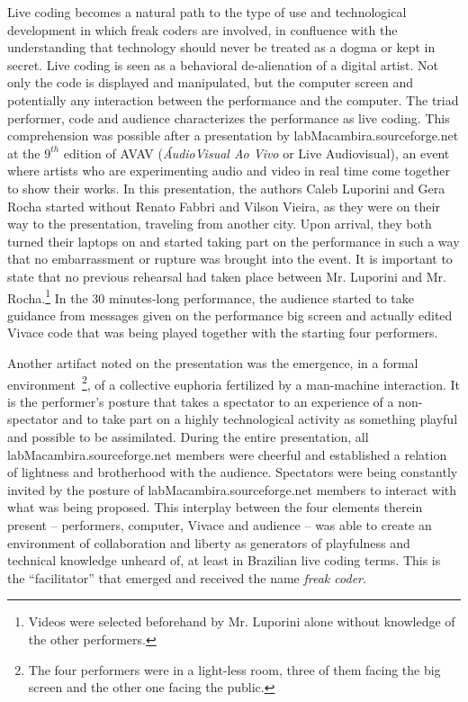 \documentclass[letterpaper, 12pt]{article}
\begin{document}
{Live coding becomes a natural path to the type of use and
technological development in which freak coders are involved, in
confluence with the understanding that technology should never be
treated as a dogma or kept in secret. Live coding is seen as a
behavioral de-alienation of a digital artist. Not only the code is
displayed and manipulated, but the computer screen and potentially any
interaction between the performance and the computer. The triad
performer, code and audience characterizes the performance as live
coding.  This comprehension was possible after a presentation by
labMacambira.sourceforge.net at the $9^{th}$ edition of AVAV
(\textit{\'{A}udioVisual Ao Vivo} or Live Audiovisual), an event where
artists who are experimenting audio and video in real time come
together to show their works. In this presentation, the authors Caleb
Luporini and Gera Rocha started without Renato Fabbri and Vilson
Vieira, as they were on their way to the presentation, traveling from
another city. Upon arrival, they both turned their laptops on and
started taking part on the performance in such a way that no
embarrassment or rupture was brought into the event.  It is important
to state that no previous rehearsal had taken place between
Mr. Luporini and Mr. Rocha.\footnote{Videos were selected beforehand
  by Mr. Luporini alone without knowledge of the other performers.} In
the 30 minutes-long performance, the audience started to take guidance
from messages given on the performance big screen and actually edited
Vivace code that was being played together with the starting four
performers.

Another artifact noted on the presentation was the emergence, in a
formal environment~\footnote{The four performers were in a light-less
  room, three of them facing the big screen and the other one facing
  the public.}, of a collective euphoria fertilized by a man-machine
interaction. It is the performer's posture that takes a spectator to
an experience of a non-spectator and to take part on a highly
technological activity as something playful and possible to be
assimilated.  During the entire presentation, all
labMacambira.sourceforge.net members were cheerful and established a
relation of lightness and brotherhood with the audience.  Spectators
were being constantly invited by the posture of
labMacambira.sourceforge.net members to interact with what was being
proposed.  This interplay between the four elements therein present --
performers, computer, Vivace and audience -- was able to create an
environment of collaboration and liberty as generators of playfulness
and technical knowledge unheard of, at least in Brazilian live coding
terms. This is the ``facilitator'' that emerged and received the name
\emph{freak coder}.

}
\end{document}
